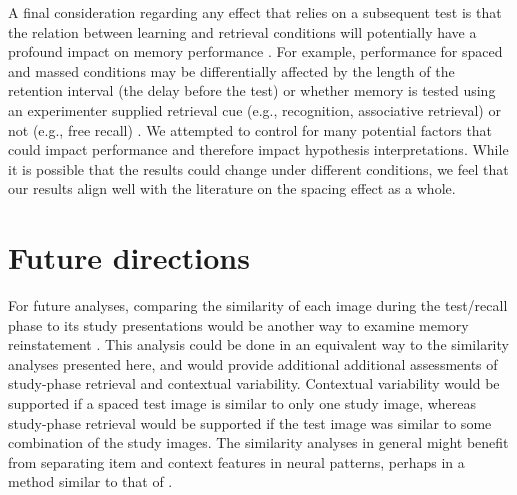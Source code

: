 A final consideration regarding any effect that relies on a subsequent test is that the relation between learning and retrieval conditions will potentially have a profound impact on memory performance \cite{TulvThom1973}.  For example, performance for spaced and massed conditions may be differentially affected by the length of the retention interval (the delay before the test) or whether memory is tested using an experimenter supplied retrieval cue (e.g., recognition, associative retrieval) or not (e.g., free recall) \cite{Glen1979,Gree1989a}.  We attempted to control for many potential factors that could impact performance and therefore impact hypothesis interpretations.  While it is possible that the results could change under different conditions, we feel that our results align well with the literature on the spacing effect as a whole.

\section{Future directions}

For future analyses, comparing the similarity of each image during the test/recall phase to its study presentations would be another way to examine memory reinstatement \cite{HowaKaha2002,LohnKaha2014b}.  This analysis could be done in an equivalent way to the similarity analyses presented here, and would provide additional additional assessments of study-phase retrieval and contextual variability.
Contextual variability would be supported if a spaced test image is similar to only one study image, whereas study-phase retrieval would be supported if the test image was similar to some combination of the study images.
The similarity analyses in general might benefit from separating item and context features in neural patterns, perhaps in a method similar to that of .



